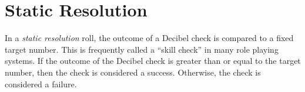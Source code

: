 \documentclass{scrartcl}
\begin{document}
\newpage

\section{Static Resolution}
In a \emph{static resolution} roll, the outcome of a Decibel check is compared to a fixed target number. This is frequently called a ``skill check'' in many role playing systems.  If the outcome of the Decibel check is greater than or equal to the target number, then the check is considered a success.  Otherwise, the check is considered a failure.

\end{document}
